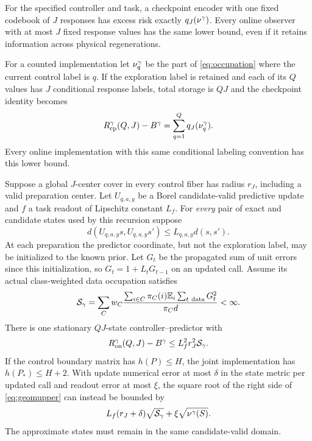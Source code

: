 \begin{theorem}\label{thm:geometry}
For the specified controller and task, a checkpoint encoder with one fixed codebook of $J$ responses has excess risk exactly $q_J(\nu^\gamma)$. Every online observer with at most $J$ fixed response values has the same lower bound, even if it retains information across physical regenerations.

For a counted implementation let $\nu_q^\gamma$ be the part of \eqref{eq:occupation} where the current control label is $q$. If the exploration label is retained and each of its $Q$ values has $J$ conditional response labels, total storage is $QJ$ and the checkpoint identity becomes
\begin{equation}\label{eq:conditionalq}
 R_{\rm cp}^{\gamma}(Q,J)-B^\gamma=\sum_{q=1}^Q q_J(\nu_q^\gamma).
\end{equation}
Every online implementation with this same conditional labeling convention has this lower bound.

Suppose a global $J$-center cover in every control fiber has radius $r_J$, including a valid preparation center. Let $U_{q,a,y}$ be a Borel candidate-valid predictive update and $f$ a task readout of Lipschitz constant $L_f$. For \emph{every} pair of exact and candidate states used by this recursion suppose
\begin{equation}\label{eq:stable}
 d(U_{q,a,y}s,U_{q,a,y}s')\le L_{q,a,y}d(s,s').
\end{equation}
At each preparation the predictor coordinate, but not the exploration label, may be initialized to the known prior. Let $G_t$ be the propagated sum of unit errors since this initialization, so $G_t=1+L_tG_{t-1}$ on an updated call. Assume its actual class-weighted data occupation satisfies
\begin{equation}\label{eq:stabmass}
 \mathcal S_\gamma=
 \sum_Cw_C{\sum_{i\in C}\pi_C(i)\mathbb E_i\sum_{t\ {\rm data}}G_t^2
                          \over\pi_Cd}<\infty.
\end{equation}
There is one stationary $QJ$-state controller--predictor with
\begin{equation}\label{eq:geomupper}
 R_{\rm on}^{\gamma}(Q,J)-B^\gamma\le L_f^2 r_J^2\mathcal S_\gamma.
\end{equation}
If the control boundary matrix has $h(P)\le H$, the joint implementation has $h(P_*)\le H+2$. With update numerical error at most $\delta$ in the state metric per updated call and readout error at most $\xi$, the square root of the right side of \eqref{eq:geomupper} can instead be bounded by
\begin{equation}\label{eq:numericalgeom}
 L_f(r_J+\delta)\sqrt{\mathcal S_\gamma}
       +\xi\sqrt{\nu^\gamma(S)}.
\end{equation}
The approximate states must remain in the same candidate-valid domain.
\end{theorem}
